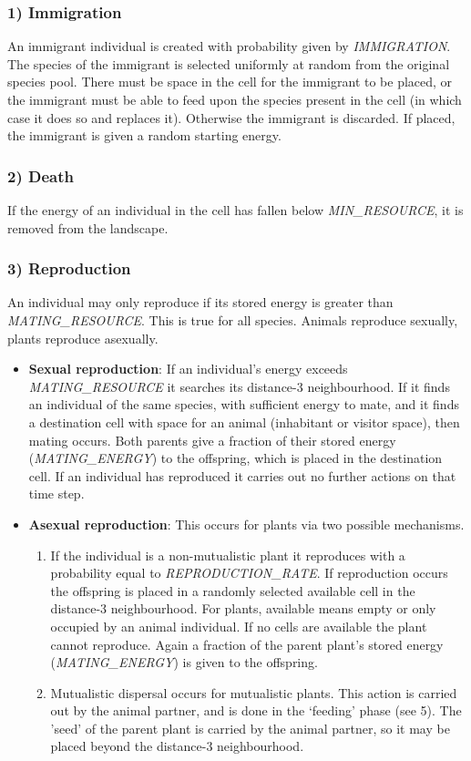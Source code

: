\subsubsection*{1) Immigration}
An immigrant individual is created with probability given by \emph{IMMIGRATION}. The species of the immigrant is selected uniformly at random from the original species pool. There must be space in the cell for the immigrant to be placed, or the immigrant must be able to feed upon the species present in the cell (in which case it does so and replaces it). Otherwise the immigrant is discarded. If placed, the immigrant is given a random starting energy.  
\subsubsection*{2) Death}
If the energy of an individual in the cell has fallen below \emph{MIN\_RESOURCE}, it is removed from the landscape.

\subsubsection*{3) Reproduction}
An individual may only reproduce if its stored energy is greater than \emph{MATING\_RESOURCE}. This is true for all species. Animals reproduce sexually, plants reproduce asexually.
\begin{itemize}
	\item \textbf{Sexual reproduction}: If an individual's energy exceeds \emph{MATING\_RESOURCE} it searches its distance-3 neighbourhood. If it finds an individual of the same species, with sufficient energy to mate, and it finds a destination cell with space for an animal (inhabitant or visitor space), then mating occurs. Both parents give a fraction of their stored energy (\emph{MATING\_ENERGY}) to the offspring, which is placed in the destination cell. If an individual has reproduced it carries out no further actions on that time step.
	\item \textbf{Asexual reproduction}: This occurs for plants via two possible mechanisms. 
	\begin{enumerate}
	\item If the individual is a non-mutualistic plant it reproduces with a probability equal to \emph{REPRODUCTION\_RATE}. If reproduction occurs the offspring is placed in a randomly selected available cell in the distance-3 neighbourhood. For plants, available means empty or only occupied by an animal individual. If no cells are available the plant cannot reproduce. Again a fraction of the parent plant's stored energy (\emph{MATING\_ENERGY}) is given to the offspring.
	\item Mutualistic dispersal occurs for mutualistic plants. This action is carried out by the animal partner, and is done in the `feeding' phase (see 5). The 'seed' of the parent plant is carried by the animal partner, so it may be placed beyond the distance-3 neighbourhood. 
    \end{enumerate}	 
\end{itemize}

